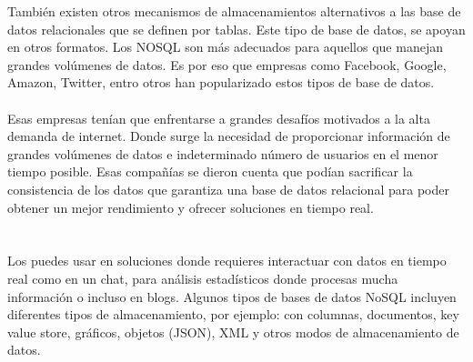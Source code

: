 \documentclass[twoside,twocolumn]{article}
\begin{document}
\begin{flushright}
\begin{itemize}
También existen otros mecanismos de almacenamientos alternativos a las base de datos relacionales que se definen por tablas. Este tipo de base de datos, se apoyan en otros formatos. Los NOSQL son más adecuados para aquellos que manejan grandes volúmenes de datos. Es por eso que empresas como Facebook, Google, Amazon, Twitter, entro otros han popularizado estos tipos de base de datos.\textbf{}\\
\textbf{}\\
Esas empresas tenían que enfrentarse a grandes desafíos motivados a la alta demanda de internet. Donde surge la necesidad de proporcionar información de grandes volúmenes de datos e indeterminado número de usuarios en el menor tiempo posible. Esas compañías se dieron cuenta que podían sacrificar la consistencia de los datos que garantiza una base de datos relacional para poder obtener un mejor rendimiento y ofrecer soluciones en tiempo real.\textbf{}\\
\textbf{}\\
\textbf{}\\
Los puedes usar en soluciones donde requieres interactuar con datos en tiempo real como en un chat, para análisis estadísticos donde procesas mucha información o incluso en blogs.
Algunos tipos de bases de datos NoSQL incluyen diferentes tipos de almacenamiento, por ejemplo: con columnas, documentos, key value store, gráficos, objetos (JSON), XML y otros modos de almacenamiento de datos.
\textbf{}\\
\textbf{}\\



\end{itemize}
\end{flushright}
\end{document}
